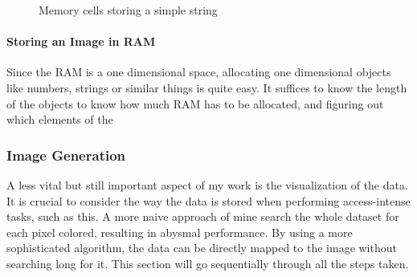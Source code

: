 \documentclass[10pt,a4paper,titlepage]{article}
\begin{document}
	\begin{figure}
		\centering
		\caption{Memory cells storing a simple string}
		\label{fig:memory_cells2}
	\end{figure}

	\paragraph{Storing an Image in RAM}
	Since the RAM is a one dimensional space, allocating one dimensional objects like numbers, strings or similar things is quite easy. It suffices to know the length of the objects to know how much RAM has to be allocated, and figuring out which elements of the 
	\subsubsection{Image Generation}
	A less vital but still important aspect of my work is the visualization of the data. It is crucial to consider the way the data is stored when performing access-intense tasks, such as this. A more naive approach of mine search the whole dataset for each pixel colored, resulting in abysmal performance. By using a more sophisticated algorithm, the data can be directly mapped to the image without searching long for it. This section will go sequentially through all the steps taken.
\end{document}
